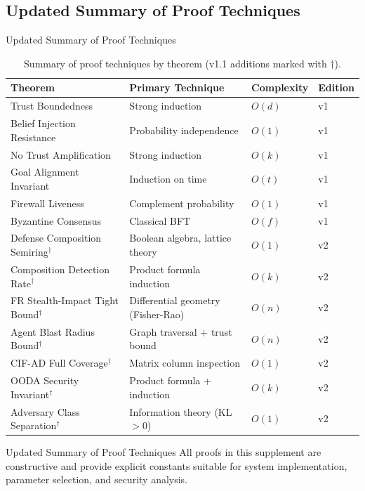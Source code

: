 \documentclass[
  ignorenonframetext,
]{beamer}
\begin{document}
\begin{frame}
\end{frame}

\subsection{Updated Summary of Proof
Techniques}\label{sec:proof-summary-v2}

\begin{frame}[allowframebreaks]{Updated Summary of Proof Techniques}
\begin{table}[htbp]
\centering
\caption{Summary of proof techniques by theorem (v1.1 additions marked with $\dagger$).}
\label{tab:proof-summary-v2}
\begin{tabular}{@{}llll@{}}
\toprule
Theorem & Primary Technique & Complexity & Edition \\
\midrule
Trust Boundedness & Strong induction & $O(d)$ & v1 \\
Belief Injection Resistance & Probability independence & $O(1)$ & v1 \\
No Trust Amplification & Strong induction & $O(k)$ & v1 \\
Goal Alignment Invariant & Induction on time & $O(t)$ & v1 \\
Firewall Liveness & Complement probability & $O(1)$ & v1 \\
Byzantine Consensus & Classical BFT & $O(f)$ & v1 \\
Defense Composition Semiring$^\dagger$ & Boolean algebra, lattice theory & $O(1)$ & v2 \\
Composition Detection Rate$^\dagger$ & Product formula induction & $O(k)$ & v2 \\
FR Stealth-Impact Tight Bound$^\dagger$ & Differential geometry (Fisher-Rao) & $O(n)$ & v2 \\
Agent Blast Radius Bound$^\dagger$ & Graph traversal + trust bound & $O(n)$ & v2 \\
CIF-AD Full Coverage$^\dagger$ & Matrix column inspection & $O(1)$ & v2 \\
OODA Security Invariant$^\dagger$ & Product formula + induction & $O(k)$ & v2 \\
Adversary Class Separation$^\dagger$ & Information theory (KL $> 0$) & $O(1)$ & v2 \\
\bottomrule
\end{tabular}
\end{table}

\end{frame}

\begin{frame}[allowframebreaks]{Updated Summary of Proof Techniques}
All proofs in this supplement are constructive and provide explicit
constants suitable for system implementation, parameter selection, and
security analysis.
\end{frame}
\end{document}
